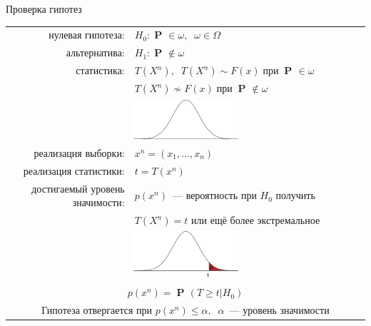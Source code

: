 \documentclass[9pt,pdf,utf8,hyperref={unicode},aspectratio=169]{beamer}
\DeclareMathOperator{\prob}{\mathbf{P}\!}
\begin{document}
\begin{frame}{Проверка гипотез}
{\begin{center}
\begin{tabular}{rl}
				нулевая гипотеза:               & $H_0\colon \prob\in\omega, \;\; \omega\in\Omega$ \\
				альтернатива:                   & $H_1\colon \prob\notin\omega$ \\
				статистика:                     & $T\left(X^n\right), \;\; T\left(X^n\right)\sim F\left(x\right) \;\text{при}\; \prob\in\omega$ \\
				& \;\;\;\;\;\;\;\;\;\;\;\;\;\; $T\left(X^n\right)\not\sim F\left(x\right) \;\text{при}\; \prob\notin\omega$ \\
				\multicolumn{2}{c}{\includegraphics[width=0.3\textwidth]{stats1.png}} \\
				реализация выборки:             & $x^n=\left(x_1,\ldots,x_n\right)$ \\
				реализация статистики:          & $t = T \left(x^n\right)$ \\
				достигаемый уровень значимости: & $p\left(x^n\right)$~--- вероятность при $H_0$ получить \\
				& $T \left(X^n\right)=t$ или ещё более экстремальное\\
				\multicolumn{2}{c}{\includegraphics[width=0.3\textwidth]{stats2.png}} \\
				\multicolumn{2}{c}{ $p\left(x^n\right) = \prob\left(T\geq t\left|H_0\right.\right)$ } \\
				\multicolumn{2}{c}{Гипотеза отвергается при $p\left(x^n\right)\leq\alpha,\;\;\alpha$~--- уровень значимости} \\
			\end{tabular}
		\end{center}
	}
\end{frame}
\end{document}
